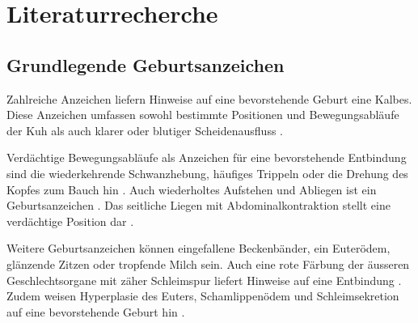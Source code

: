 \section{Literaturrecherche}
\subsection{Grundlegende Geburtsanzeichen}

Zahlreiche Anzeichen liefern Hinweise auf eine bevorstehende Geburt eine Kalbes. Diese Anzeichen umfassen sowohl bestimmte Positionen und Bewegungsabläufe der Kuh als auch klarer oder blutiger Scheidenausfluss \citep[S. 4847]{Lange2017}.

Verdächtige Bewegungsabläufe als Anzeichen für eine bevorstehende Entbindung sind die wiederkehrende Schwanzhebung, häufiges Trippeln oder die Drehung des Kopfes zum Bauch hin \citep[S. 4847]{Lange2017}. Auch wiederholtes Aufstehen und Abliegen ist ein Geburtsanzeichen \citep[S. 352]{Saint-Dizier2015}. Das seitliche Liegen mit Abdominalkontraktion stellt eine verdächtige Position dar \citep[S. 4847]{Lange2017}. 

Weitere Geburtsanzeichen können eingefallene Beckenbänder, ein Euterödem, glänzende Zitzen oder tropfende Milch sein. Auch eine rote Färbung der  äusseren Geschlechtsorgane mit zäher Schleimspur liefert Hinweise auf eine Entbindung \citep[S. 6]{Traulsen2013}. Zudem weisen Hyperplasie des Euters, Schamlippenödem und Schleimsekretion auf eine bevorstehende Geburt hin \citep[S. 178]{Streyl2011}.

